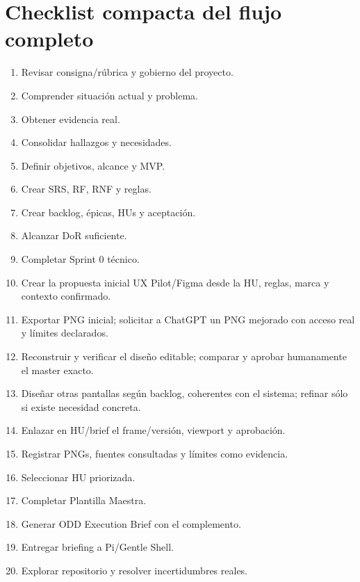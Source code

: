 \documentclass[11pt,a4paper]{article}
\begin{document}
\appendix
\section{Checklist compacta del flujo completo}

\begin{enumerate}
    \item[\(\square\)] Revisar consigna/rúbrica y gobierno del proyecto.
    \item[\(\square\)] Comprender situación actual y problema.
    \item[\(\square\)] Obtener evidencia real.
    \item[\(\square\)] Consolidar hallazgos y necesidades.
    \item[\(\square\)] Definir objetivos, alcance y MVP.
    \item[\(\square\)] Crear SRS, RF, RNF y reglas.
    \item[\(\square\)] Crear backlog, épicas, HUs y aceptación.
    \item[\(\square\)] Alcanzar DoR suficiente.
    \item[\(\square\)] Completar Sprint 0 técnico.
    \item[\(\square\)] Crear la propuesta inicial UX Pilot/Figma desde la HU, reglas, marca y contexto confirmado.
    \item[\(\square\)] Exportar PNG inicial; solicitar a ChatGPT un PNG mejorado con acceso real y límites declarados.
    \item[\(\square\)] Reconstruir y verificar el diseño editable; comparar y aprobar humanamente el master exacto.
    \item[\(\square\)] Diseñar otras pantallas según backlog, coherentes con el sistema; refinar sólo si existe necesidad concreta.
    \item[\(\square\)] Enlazar en HU/brief el frame/versión, viewport y aprobación.
    \item[\(\square\)] Registrar PNGs, fuentes consultadas y límites como evidencia.
    \item[\(\square\)] Seleccionar HU priorizada.
    \item[\(\square\)] Completar Plantilla Maestra.
    \item[\(\square\)] Generar ODD Execution Brief con el complemento.
    \item[\(\square\)] Entregar briefing a Pi/Gentle Shell.
    \item[\(\square\)] Explorar repositorio y resolver incertidumbres reales.

\end{enumerate}
\end{document}
